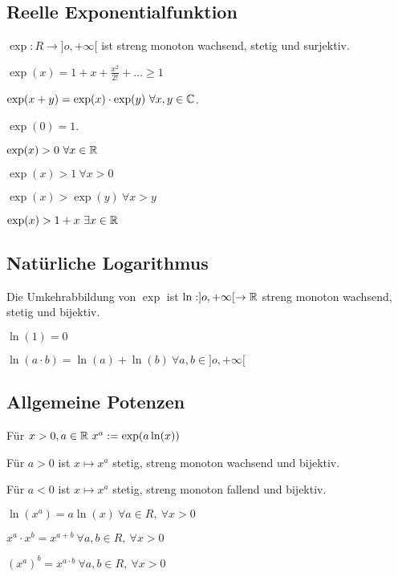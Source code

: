 \subsection{Reelle Exponentialfunktion}
$\exp: R \to ]o, +\infty[$ ist streng monoton wachsend, stetig und surjektiv.
\begin{compactitem}
    \item $\exp(x) = 1 + x + \frac{x^2}{2!} + \dots \ge 1$
    \item $\exp(x + y ) = \exp(x) \cdot \exp(y) \ \forall x,y \in \C$.
    \item $\exp(0) = 1$.
    \item $\exp(x) > 0 \ \forall x \in \mathbb{R}$
    \item $\exp(x) > 1 \ \forall x > 0$
    \item $\exp(x) > \exp(y) \ \forall x > y$
    \item $\exp(x) > 1 + x \ \exists x \in \mathbb{R}$
\end{compactitem}

\subsection{Natürliche Logarithmus}
Die Umkehrabbildung von $\exp$ ist $\ln: ]o, +\infty[ \to \mathbb{R}$ streng monoton wachsend, stetig und bijektiv.
\begin{compactitem}
    \item $\ln(1) = 0$
    \item $\ln(a \cdot b) = \ln(a) + \ln(b) \ \forall a,b \in ]o, +\infty[$
\end{compactitem}

\subsection{Allgemeine Potenzen}
Für $x > 0, a \in \mathbb{R} \ x^a := \exp(a \ln(x))$
\begin{compactitem}
    \item Für $a > 0$ ist $x \mapsto x^a$ stetig, streng monoton wachsend und bijektiv.
    \item Für $a < 0$ ist $x \mapsto x^a$ stetig, streng monoton fallend und bijektiv.
    \item $\ln(x^a) = a \ln(x) \ \forall a \in R, \ \forall x > 0$
    \item $x^a \cdot x ^b = x^{a + b} \ \forall a,b \in R, \ \forall x > 0$
    \item $(x^a)^b = x^{a \cdot b} \ \forall a,b \in R, \ \forall x > 0$
\end{compactitem}

